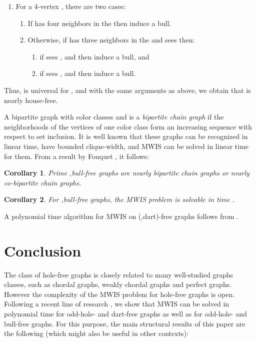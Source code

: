 \documentclass[11pt]{article}
\newcommand{\qed}{\hfill }
\newcommand{\0}{\text{ has a co-join to }}
\newcommand{\1}{\text{ has a join to }}
\newtheorem{coro}{Corollary}
\begin{document}
\begin{enumerate}
\item For a 4-vertex , there are two cases: 

\begin{enumerate}
\item If  has four neighbors in the  then  induce a bull. 

\item Otherwise, if  has three neighbors in the  and sees  then:
\begin{enumerate}
\item if  sees ,  and  then  induce a bull, and  
\item if  sees ,  and  then  induce a bull.      
\end{enumerate}
\end{enumerate} 
 
\end{enumerate}
 
Thus,  is universal for , and with the same arguments as above, we obtain that  is nearly house-free.
\qed  

\medskip

A bipartite graph  with color classes  and  is a {\em bipartite chain graph} if the neighborhoods of the vertices of one color class form an increasing sequence with respect to set inclusion. It is well known that these graphs can be recognized in linear time, have bounded clique-width, and MWIS can be solved in linear time for them. From a result by Fouquet \cite{Fouqu1993}, it follows: 
 
\begin{coro}\label{P5bullfrnearlychain}
Prime ,bull-free graphs are nearly bipartite chain graphs or nearly co-bipartite chain graphs. 
\end{coro}

\begin{coro}\label{P5bullfrMWIS}
For ,bull-free graphs, the MWIS problem is solvable in time . 
\end{coro}

A polynomial time algorithm for MWIS on (,dart)-free graphs follows from \cite{Mosca2004}. 

\section{Conclusion}

The class of hole-free graphs is closely related to many well-studied graphs classes, such as chordal graphs, weakly chordal graphs and perfect graphs. However the complexity of the MWIS problem for hole-free graphs is open. Following a recent line of research \cite{BraGia2012,BraGiaMaf2012}, we show that MWIS can be solved in polynomial time for odd-hole- and dart-free graphs as well as for odd-hole- and bull-free graphs. For this purpose, the main structural results of this paper are the following (which might also be useful in other contexts):  
\end{document}
